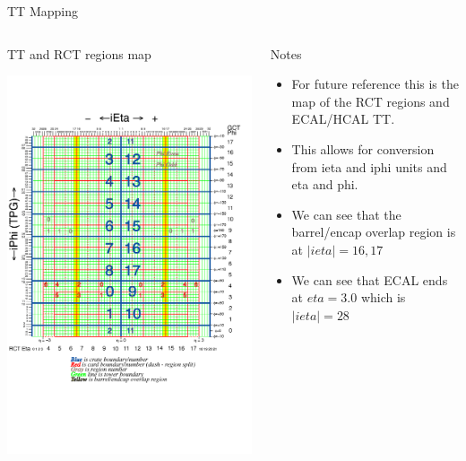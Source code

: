\documentclass[8pt]{beamer}
\begin{document}
\begin{frame}{TT Mapping}

\begin{columns}
 
\begin{block}{TT and RCT regions map}
\centering

\includegraphics[width=0.8\linewidth]{fig/towers_ieta_iphi_2009.png}

\end{block}

\begin{block}{Notes}
\centering

\begin{itemize}
 \item For future reference this is the map of the RCT regions and ECAL/HCAL TT.
 \item This allows for conversion from ieta and iphi units and eta and phi.
 \item We can see that the barrel/encap overlap region is at $|ieta|=16,17$
 \item We can see that ECAL ends at $eta=3.0$ which is $|ieta|=28$
\end{itemize}

\end{block}

\end{columns}

\end{frame}
\end{document}
